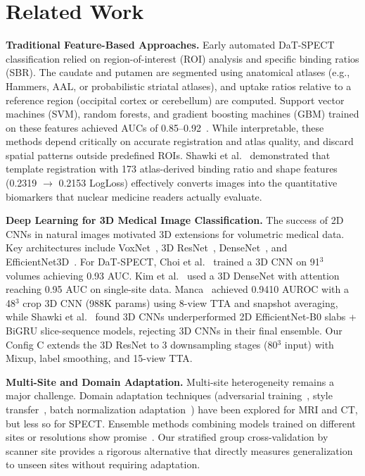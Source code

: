 \section{Related Work}
\label{sec:related_work}

\noindent\textbf{Traditional Feature-Based Approaches.}
Early automated DaT-SPECT classification relied on region-of-interest (ROI) analysis and specific binding ratios (SBR). The caudate and putamen are segmented using anatomical atlases (e.g., Hammers, AAL, or probabilistic striatal atlases), and uptake ratios relative to a reference region (occipital cortex or cerebellum) are computed. Support vector machines (SVM), random forests, and gradient boosting machines (GBM) trained on these features achieved AUCs of 0.85--0.92~\cite{segovia2019dat,liu2020dat,khan2021dat}. While interpretable, these methods depend critically on accurate registration and atlas quality, and discard spatial patterns outside predefined ROIs. Shawki et al.~\cite{shawki2024dat} demonstrated that template registration with 173 atlas-derived binding ratio and shape features (0.2319 $\to$ 0.2153 LogLoss) effectively converts images into the quantitative biomarkers that nuclear medicine readers actually evaluate.

\noindent\textbf{Deep Learning for 3D Medical Image Classification.}
The success of 2D CNNs in natural images motivated 3D extensions for volumetric medical data. Key architectures include VoxNet~\cite{maturana2015voxnet}, 3D ResNet~\cite{hara20183d}, DenseNet~\cite{li2018densely}, and EfficientNet3D~\cite{chen2020efficientnet3d}. For DaT-SPECT, Choi et al.~\cite{choi2018deep} trained a 3D CNN on 91$^3$ volumes achieving 0.93 AUC. Kim et al.~\cite{kim2020deep} used a 3D DenseNet with attention reaching 0.95 AUC on single-site data. Manca~\cite{manca2024dat} achieved 0.9410 AUROC with a 48$^3$ crop 3D CNN (988K params) using 8-view TTA and snapshot averaging, while Shawki et al.~\cite{shawki2024dat} found 3D CNNs underperformed 2D EfficientNet-B0 slabs + BiGRU slice-sequence models, rejecting 3D CNNs in their final ensemble. Our Config C extends the 3D ResNet to 3 downsampling stages (80$^3$ input) with Mixup, label smoothing, and 15-view TTA.

\noindent\textbf{Multi-Site and Domain Adaptation.}
Multi-site heterogeneity remains a major challenge. Domain adaptation techniques (adversarial training~\cite{ganin2016domain}, style transfer~\cite{zhang2020style}, batch normalization adaptation~\cite{li2019adaptive}) have been explored for MRI and CT, but less so for SPECT. Ensemble methods combining models trained on different sites or resolutions show promise~\cite{li2020ensemble}. Our stratified group cross-validation by scanner site provides a rigorous alternative that directly measures generalization to unseen sites without requiring adaptation.

